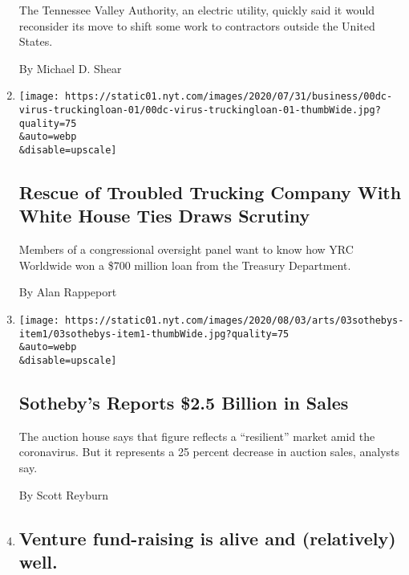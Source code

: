 \begin{enumerate}
  The Tennessee Valley Authority, an electric utility, quickly said it
  would reconsider its move to shift some work to contractors outside
  the United States.

  By Michael D. Shear
\item
  \href{/2020/08/03/us/politics/yrc-coronavirus-relief-funds.html}{}

  \texttt{[image: https://static01.nyt.com/images/2020/07/31/business/00dc-virus-truckingloan-01/00dc-virus-truckingloan-01-thumbWide.jpg?quality=75\\\&auto=webp\\\&disable=upscale]}

  \hypertarget{rescue-of-troubled-trucking-company-with-white-house-ties-draws-scrutiny}{%
  \subsection{Rescue of Troubled Trucking Company With White House Ties
  Draws
  Scrutiny}\label{rescue-of-troubled-trucking-company-with-white-house-ties-draws-scrutiny}}

  Members of a congressional oversight panel want to know how YRC
  Worldwide won a \$700 million loan from the Treasury Department.

  By Alan Rappeport
\item
  \href{/2020/08/03/arts/design/sothebys-sales.html}{}

  \texttt{[image: https://static01.nyt.com/images/2020/08/03/arts/03sothebys-item1/03sothebys-item1-thumbWide.jpg?quality=75\\\&auto=webp\\\&disable=upscale]}

  \hypertarget{sothebys-reports-25-billion-in-sales}{%
  \subsection{Sotheby's Reports \$2.5 Billion in
  Sales}\label{sothebys-reports-25-billion-in-sales}}

  The auction house says that figure reflects a ``resilient'' market
  amid the coronavirus. But it represents a 25 percent decrease in
  auction sales, analysts say.

  By Scott Reyburn
\item
  \href{/2020/08/03/business/venture-fund-raising-is-alive-and-relatively-well.html}{}

  \hypertarget{venture-fund-raising-is-alive-and-relatively-well}{%
  \subsection{Venture fund-raising is alive and (relatively)
  well.}\label{venture-fund-raising-is-alive-and-relatively-well}}


\end{enumerate}
